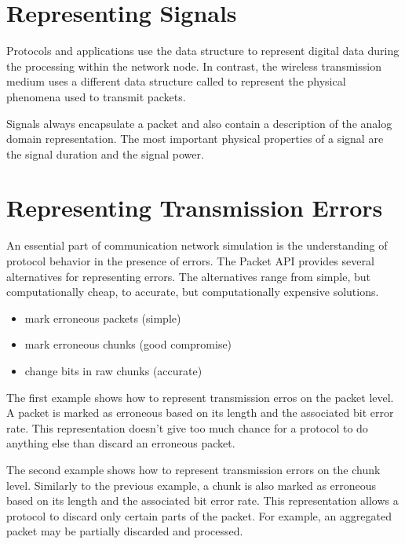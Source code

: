 
\section{Representing Signals}

Protocols and applications use the  data structure to represent
digital data during the processing within the network node. In contrast, the
wireless transmission medium uses a different data structure called
 to represent the physical phenomena used to transmit packets.


Signals always encapsulate a packet and also contain a description of the analog
domain representation. The most important physical properties of a signal are
the signal duration and the signal power.

\section{Representing Transmission Errors}

An essential part of communication network simulation is the understanding of
protocol behavior in the presence of errors. The Packet API provides several
alternatives for representing errors. The alternatives range from simple, but
computationally cheap, to accurate, but computationally expensive solutions.

\begin{itemize}
    \item mark erroneous packets (simple)
    \item mark erroneous chunks (good compromise)
    \item change bits in raw chunks (accurate)
\end{itemize}

The first example shows how to represent transmission erros on the packet level.
A packet is marked as erroneous based on its length and the associated bit error
rate. This representation doesn't give too much chance for a protocol to do
anything else than discard an erroneous packet.


The second example shows how to represent transmission errors on the chunk
level. Similarly to the previous example, a chunk is also marked as erroneous
based on its length and the associated bit error rate. This representation
allows a protocol to discard only certain parts of the packet. For example, an
aggregated packet may be partially discarded and processed.

